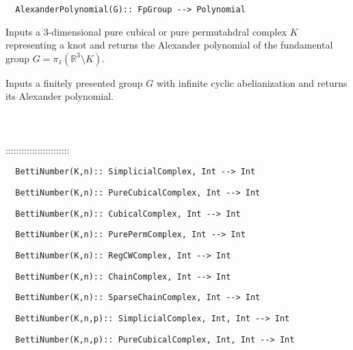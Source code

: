 \documentclass[a4paper,11pt]{report}
\begin{document}
{\begin{verbatim}  AlexanderPolynomial(G):: FpGroup --> Polynomial
\end{verbatim}


 

 Inputs a $3$-dimensional pure cubical or pure permutahdral complex $K$ representing a knot and returns the Alexander polynomial of the fundamental
group $G = \pi_1(\mathbb R^3\setminus K)$. 

 Inputs a finitely presented group $G$ with infinite cyclic abelianization and returns its Alexander polynomial. \\
 \\
 \\
 \\
 ::::::::::::::::::::::::\\
 
\begin{verbatim}  BettiNumber(K,n):: SimplicialComplex, Int --> Int
\end{verbatim}
 
\begin{verbatim}  BettiNumber(K,n):: PureCubicalComplex, Int --> Int
\end{verbatim}
 
\begin{verbatim}  BettiNumber(K,n):: CubicalComplex, Int --> Int
\end{verbatim}
 
\begin{verbatim}  BettiNumber(K,n):: PurePermComplex, Int --> Int
\end{verbatim}
 
\begin{verbatim}  BettiNumber(K,n):: RegCWComplex, Int --> Int
\end{verbatim}
 
\begin{verbatim}  BettiNumber(K,n):: ChainComplex, Int --> Int
\end{verbatim}
 
\begin{verbatim}  BettiNumber(K,n):: SparseChainComplex, Int --> Int
\end{verbatim}
 
\begin{verbatim}  BettiNumber(K,n,p):: SimplicialComplex, Int, Int --> Int
\end{verbatim}
 
\begin{verbatim}  BettiNumber(K,n,p):: PureCubicalComplex, Int, Int --> Int
\end{verbatim}
 
}
\end{document}
